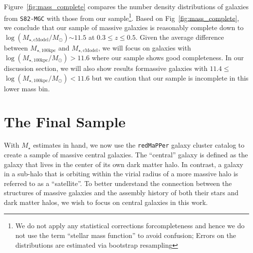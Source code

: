\documentclass[a4paper,fleqn,usenatbib]{mnras}
\def\redm{\texttt{redMaPPer}}
\def\rbcg{\texttt{cenHighMh}}
\def\nbcg{\texttt{cenLowMh}}
\def\mstar{{$M_{\star}$}}
\def\mtot{{$M_{\star,100\mathrm{kpc}}$}}
\def\mcmodel{{$M_{\star,\mathrm{cModel}}$}}
\def\logmtot{{$\log (M_{\star,100\mathrm{kpc}}/M_{\odot})$}}
\def\logmcmodel{{$\log (M_{\star,\mathrm{cModel}}/M_{\odot})$}}
\begin{document}
    Figure~\ref{fig:mass_complete} compares the number density distributions of galaxies from \texttt{S82-MGC} with those from our sample\footnote{We do not apply any statistical corrections forcompleteness and hence we do not use the term ``stellar mass function'' to avoid confusion;
    Errors on the distributions are estimated via bootstrap resampling}. 
    Based on Fig~\ref{fig:mass_complete}, we conclude that our sample of massive 
    galaxies is reasonably complete down to \logmcmodel{}${\sim} 11.5$ at 
    $0.3 \leq z \leq 0.5$. 
    Given the average difference between \mtot{} and \mcmodel{}, we will focus on galaxies with \logmtot{}$> 11.6$ where our sample shows good completeness. In our discussion section, we will also show results formassive galaxies with $11.4 \le$\logmtot{}$<11.6$ but we caution that our sample is incomplete in this  lower mass bin.
    
    

\section{The Final Sample}
    \label{sec:final}
    
	With  \mstar{} estimates in hand, we now use the \redm{} galaxy cluster catalog to  create a sample of massive central galaxies. The ``central'' galaxy is defined as the galaxy that lives in the 
	center of its own dark matter halo.  
	In contrast, a galaxy in a sub-halo that is orbiting within the virial radius of a 
	more massive halo is referred to as a ``satellite''. 
	To better understand the connection between the structures of massive 
	galaxies and the assembly history of both their stars and dark matter halos, we wish to focus on central 
	galaxies in this work. 
    
\end{document}
